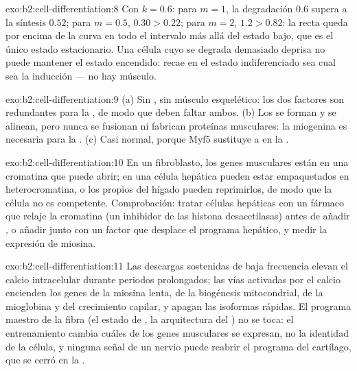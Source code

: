 \begin{solution}{exo:b2:cell-differentiation:8}
Con $k = 0.6$: para $m = 1$, la degradación $0.6$ supera a la síntesis
$0.52$; para $m = 0.5$, $0.30 > 0.22$; para $m = 2$, $1.2 > 0.82$: la
recta queda por encima de la curva en todo el intervalo más allá del
estado bajo, que es el único estado estacionario. Una célula cuyo  se
degrada demasiado deprisa no puede mantener el estado encendido: recae en
el estado indiferenciado sea cual sea la inducción --- no hay músculo.
\end{solution}

\begin{solution}{exo:b2:cell-differentiation:9}
(a) Sin , sin músculo esquelético: los dos factores son
redundantes para la , de modo que deben faltar ambos.
(b) Los  se forman y se alinean, pero nunca se fusionan ni
fabrican proteínas musculares: la miogenina es necesaria para la
. (c) Casi normal, porque Myf5 sustituye a  en la
.
\end{solution}

\begin{solution}{exo:b2:cell-differentiation:10}
En un fibroblasto, los genes musculares están en una cromatina que 
puede abrir; en una célula hepática pueden estar empaquetados en
heterocromatina, o los propios  del hígado pueden
reprimirlos, de modo que la célula no es competente. Comprobación: tratar
células hepáticas con un fármaco que relaje la cromatina (un inhibidor de
las histona desacetilasas) antes de añadir , o añadir  junto con
un factor que desplace el programa hepático, y medir la expresión de
miosina.
\end{solution}

\begin{solution}{exo:b2:cell-differentiation:11}
Las descargas sostenidas de baja frecuencia elevan el calcio intracelular
durante periodos prolongados; las vías activadas por el calcio encienden
los genes de la miosina lenta, de la biogénesis mitocondrial, de la
mioglobina y del crecimiento capilar, y apagan las isoformas rápidas. El
programa maestro de la fibra (el estado de , la arquitectura del
) no se toca: el entrenamiento cambia cuáles de los genes
musculares se expresan, no la identidad de la célula, y ninguna señal de
un nervio puede reabrir el programa del cartílago, que se cerró en la
.
\end{solution}

